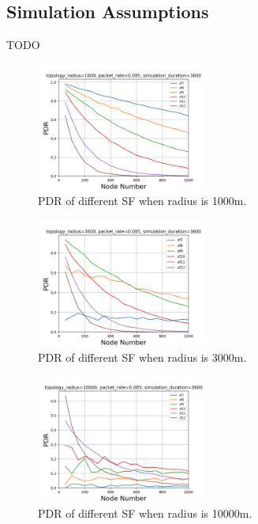 \documentclass[conference]{IEEEtran}
\begin{document}
\subsection{Simulation Assumptions}
TODO

\begin{figure}
\centering
\includegraphics[width=0.5\textwidth]{sf_1000}
\caption{PDR of different SF when radius is 1000m.}
\label{fig:sf_1000}
\end{figure}

\begin{figure}
\centering
\includegraphics[width=0.5\textwidth]{sf_3000}
\caption{PDR of different SF when radius is 3000m.}
\label{fig:sf_3000}
\end{figure}

\begin{figure}
\centering
\includegraphics[width=0.5\textwidth]{sf_10000}
\caption{PDR of different SF when radius is 10000m.}
\label{fig:sf_10000}
\end{figure}
\end{document}
